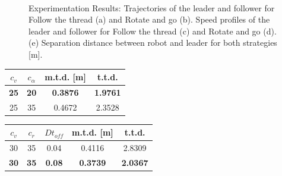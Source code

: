 \documentclass[journal]{IEEEtran}
\begin{document}
\begin{figure}
    \\
    \vspace*{-1.8em}
  \caption{Experimentation Results: Trajectories of the leader and follower for Follow the thread (a) and Rotate and go (b). 
        Speed profiles of the leader and follower for Follow the thread (c) and Rotate and go (d). 
        (e) Separation distance between robot and leader for both strategies [m].}
  \label{fig:realworldresults} 
\end{figure}


\begin{center}
\begin{tabular}{ |c|c|c|c| }
\hline
$c_v$ & $c_{\alpha}$ & m.t.d. [m] & t.t.d. \\
\hline
\textbf{25}  &   \textbf{20}  & \textbf{0.3876} & \textbf{1.9761}\\
25  &   35  & 0.4672 & 2.3528\\
\hline
\end{tabular}
\label{tab:cap_ft_npd_table}
\end{center}


\begin{center}
\begin{tabular}{ |c|c|c|c|c| }
\hline
$c_v$ & $c_r$ & $Dt_{off}$ & m.t.d. [m] & t.t.d. \\
\hline
30  &   35  & 0.04  & 0.4116 & 2.8309\\
\textbf{30}  &   \textbf{35}  & \textbf{0.08 }& \textbf{0.3739} & \textbf{2.0367}\\
\hline

\end{tabular}
\label{tab:cap_rg_npd_table}
\end{center}
\end{document}
